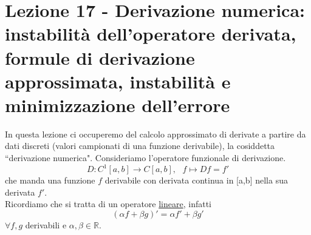 \section[Lezione 17 - Derivazione numerica]{Lezione 17 - Derivazione numerica: instabilità dell'operatore derivata, formule di derivazione approssimata, instabilità e minimizzazione dell'errore}

In questa lezione ci occuperemo del calcolo approssimato di derivate a partire da dati discreti (valori campionati di una funzione derivabile), la cosiddetta ``derivazione numerica". Consideriamo l'operatore funzionale di derivazione.
\begin{equation*}
    D:C^1[a,b]\rightarrow C[a,b],\  \  \  f\longmapsto Df=f'
\end{equation*}
che manda una funzione $f$ derivabile con derivata continua in [a,b] nella sua derivata $f'$.\\ Ricordiamo che si tratta di un operatore \uline{lineare}, infatti 
\begin{equation*}
    (\alpha f+\beta g)'=\alpha f'+\beta g'
\end{equation*}
$\forall f,g$ derivabili e $\alpha,\beta\in\mathbb{R}$.

